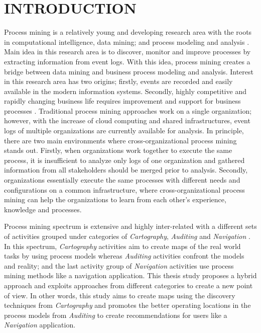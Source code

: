 \chapter{INTRODUCTION}
\label{chp:introduction}

Process mining is a relatively young and developing research area with the roots in computational intelligence, data mining; and process modeling and analysis \cite{van2012process}. Main idea in this research area is to discover, monitor and improve processes by extracting information from event logs. With this idea, process mining creates a bridge between data mining and business process modeling and analysis. Interest in this research area has two origins; firstly, events are recorded and easily available in the modern information systems. Secondly, highly competitive and rapidly changing business life requires improvement and support for business processes \cite{van2012process}. Traditional process mining approaches work on a single organization; however, with the increase of cloud computing and shared infrastructures, event logs of multiple organizations are currently available for analysis. In principle, there are two main environments where cross-organizational process mining stands out. Firstly, when organizations work together to execute the same process, it is insufficient to analyze only logs of one organization and gathered information from all stakeholders should be merged prior to analysis. Secondly, organizations essentially execute the same processes with different needs and configurations on a common infrastructure, where cross-organizational process mining can help the organizations to learn from each other's experience, knowledge and processes.

Process mining spectrum is extensive and highly inter-related with a different sets of activities grouped under categories of \textit{Cartography}, \textit{Auditing} and \textit{Navigation} \cite{van2011process}. In this spectrum, \textit{Cartography} activities aim to create maps of the real world tasks by using process models whereas \textit{Auditing} activities confront the models and reality; and the last activity group of \textit{Navigation} activities use process mining methods like a navigation application. This thesis study proposes a hybrid approach and exploits approaches from different categories to create a new point of view. In other words, this study aims to create maps using the discovery techniques from \textit{Cartography} and promotes the better operating locations in the process models from \textit{Auditing} to create recommendations for users like a \textit{Navigation} application. 

